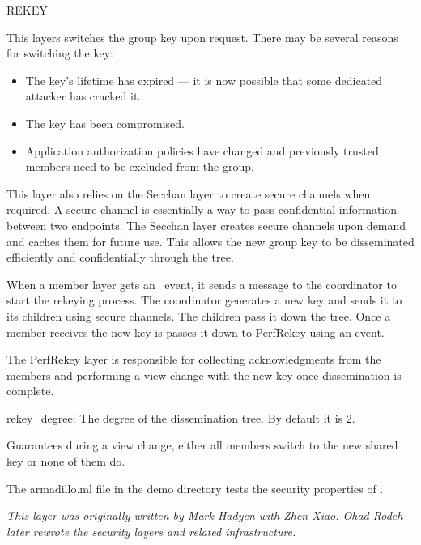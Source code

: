 \begin{Layer}{REKEY}

This layers switches the group key upon request. There may be several 
reasons for switching the key:
\begin{itemize}
\item The key's lifetime has expired --- it is now possible that some
dedicated attacker has cracked it.
\item The key has been compromised. 
\item Application authorization policies have changed and previously trusted
members need to be excluded from the group. 
\end{itemize}

This layer also relies on the Secchan layer to create secure
channels when required. A secure channel is essentially a way
to pass confidential information between two endpoints. The Secchan
layer creates secure channels upon demand and caches them for future
use. This allows the new group key to be disseminated efficiently and
confidentially through the tree. 

\begin{Protocol}
When a member layer gets an \ERekeyPrcl\ event, it sends a message to the
coordinator to start the rekeying process.  The coordinator generates
a new key and sends it to its children using secure channels. The
children pass it down the tree. Once a member receives the new key is
passes it down to PerfRekey using an  event.

The PerfRekey layer is responsible for collecting acknowledgments from the
members and performing a view change with the new key once
dissemination is complete. 
\end{Protocol}

\begin{Parameters}
\item {rekey\_degree:} The degree of the dissemination tree. By
default it is 2.
\end{Parameters}

\begin{Properties}
\item
Guarantees during a view change, either all members switch to the new
shared key or none of them do.
\end{Properties}

\begin{Sources}
\end{Sources}

\begin{GenEvent}
\genevent{\DnCast}
\genevent{\DnSend}
\end{GenEvent}

\begin{Testing}
\item 
The armadillo.ml file in the demo directory tests the security properties
of \ensemble.
\end{Testing}

\emph{This layer was originally written by Mark Hadyen with Zhen Xiao.
Ohad Rodeh later rewrote the security layers and related infrastructure.}
\end{Layer}


